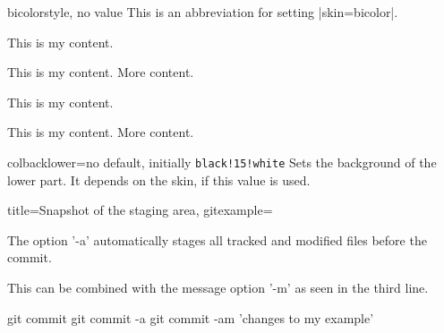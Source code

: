 \begin{docTcbKey}{bicolor}{}{style, no value}
  This is an abbreviation for setting |skin=bicolor|.
\end{docTcbKey}


\begin{dispExample}
\begin{tcbraster}[bicolor,raster equal height,raster columns=4,
    colback=LightGreen,colframe=DarkGreen,colbacklower=LimeGreen!75!LightGreen,
    colbacktitle=LimeGreen!75!DarkGreen,
    left=1mm,right=1mm,top=1mm,bottom=1mm,middle=1mm]
  \begin{tcolorbox}
    This is my content.
  \end{tcolorbox}
  \begin{tcolorbox}
    This is my content.
    \tcblower
    More content.
  \end{tcolorbox}
  \begin{tcolorbox}[adjusted title=My title]
    This is my content.
  \end{tcolorbox}
  \begin{tcolorbox}[adjusted title=My title]
    This is my content.
    \tcblower
    More content.
  \end{tcolorbox}
\end{tcbraster}
\end{dispExample}

\begin{docTcbKey}{colbacklower}{=}{no default, initially \texttt{black!15!white}}
  Sets the background  of the lower part. It depends on the skin,
  if this value is used.
\end{docTcbKey}

\begin{dispExample}

\begin{tcblisting}{title={Snapshot of the staging area},
  gitexample={The option '-a' automatically stages all tracked and modified
              files before the commit.\par
              This can be combined with the message option '-m'
              as seen in the third line.}}
git commit
git commit -a
git commit -am 'changes to my example'
\end{tcblisting}
\end{dispExample}


